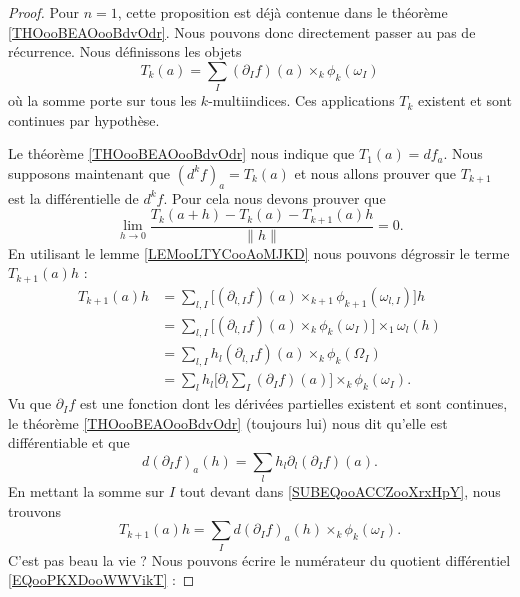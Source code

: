 \begin{proof}
    Pour \( n=1\), cette proposition est déjà contenue dans le théorème \ref{THOooBEAOooBdvOdr}. Nous pouvons donc directement passer au pas de récurrence. Nous définissons les objets
    \begin{equation}
        T_k(a)=\sum_I(\partial_If)(a)\times_k\phi_k(\omega_{I})
    \end{equation}
    où la somme porte sur tous les \( k\)-multiindices. Ces applications \( T_k\) existent et sont continues par hypothèse. 

    Le théorème \ref{THOooBEAOooBdvOdr} nous indique que \( T_1(a)=df_a\). Nous supposons maintenant que \( (d^kf)_a=T_k(a)\) et nous allons prouver que \( T_{k+1}\) est la différentielle de \( d^kf\). Pour cela nous devons prouver que
    \begin{equation}        \label{EQooPKXDooWWVikT}
        \lim_{h\to 0} \frac{ T_k(a+h)-T_k(a)-T_{k+1}(a)h }{ \| h \| }=0.
    \end{equation}
    En utilisant le lemme \ref{LEMooLTYCooAoMJKD} nous pouvons dégrossir le terme \( T_{k+1}(a)h\) :
    \begin{subequations}
        \begin{align}
            T_{k+1}(a)h&=\sum_{l,I}\big[ (\partial_{l,I}f)(a)\times_{k+1}\phi_{k+1}(\omega_{l,I}) \big]h\\
            &=\sum_{l,I}\big[ (\partial_{l,I}f)(a)\times_k\phi_k(\omega_I) \big]\times_1\omega_l(h)\\
            &=\sum_{l,I}h_l(\partial_{l,I}f)(a)\times_k\phi_k(\Omega_I)\\
            &=\sum_lh_l\big[ \partial_l\sum_I(\partial_If)(a) \big]\times_k\phi_k(\omega_I).        \label{SUBEQooACCZooXrxHpY}
        \end{align}
    \end{subequations}
    Vu que \( \partial_If\) est une fonction dont les dérivées partielles existent et sont continues, le théorème \ref{THOooBEAOooBdvOdr} (toujours lui) nous dit qu'elle est différentiable et que
    \begin{equation}
        d(\partial_If)_a(h)=\sum_lh_l\partial_l(\partial_If)(a).
    \end{equation}
    En mettant la somme sur \( I\) tout devant dans \eqref{SUBEQooACCZooXrxHpY}, nous trouvons
    \begin{equation}
        T_{k+1}(a)h=\sum_Id(\partial_If)_a(h)\times_k\phi_k(\omega_I).
    \end{equation}
    C'est pas beau la vie ? Nous pouvons écrire le numérateur du quotient différentiel \eqref{EQooPKXDooWWVikT} :

\end{proof}
